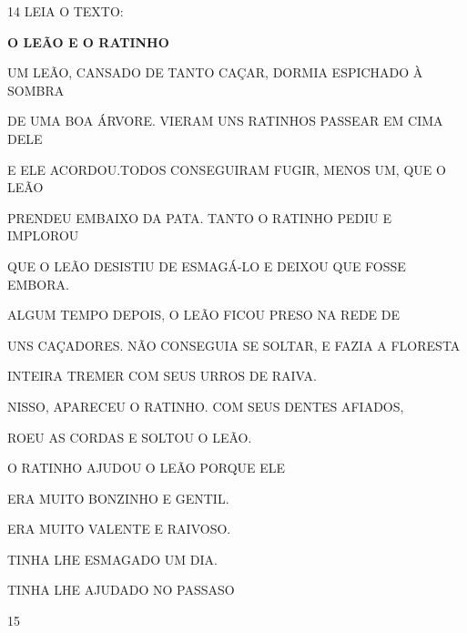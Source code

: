 \begin{escola}
{



\num{14} LEIA O TEXTO:

\textbf{O LEÃO E O RATINHO}

UM LEÃO, CANSADO DE TANTO CAÇAR, DORMIA ESPICHADO À SOMBRA

DE UMA BOA ÁRVORE. VIERAM UNS RATINHOS PASSEAR EM CIMA DELE

E ELE ACORDOU.TODOS CONSEGUIRAM FUGIR, MENOS UM, QUE O LEÃO

PRENDEU EMBAIXO DA PATA. TANTO O RATINHO PEDIU E IMPLOROU

QUE O LEÃO DESISTIU DE ESMAGÁ-LO E DEIXOU QUE FOSSE EMBORA.

ALGUM TEMPO DEPOIS, O LEÃO FICOU PRESO NA REDE DE

UNS CAÇADORES. NÃO CONSEGUIA SE SOLTAR, E FAZIA A FLORESTA

INTEIRA TREMER COM SEUS URROS DE RAIVA.

NISSO, APARECEU O RATINHO. COM SEUS DENTES AFIADOS,

ROEU AS CORDAS E SOLTOU O LEÃO.


O RATINHO AJUDOU O LEÃO PORQUE ELE

\begin{escolha}
\item ERA MUITO BONZINHO E GENTIL.

\item ERA MUITO VALENTE E RAIVOSO.

\item TINHA LHE ESMAGADO UM DIA.

\item TINHA LHE AJUDADO NO PASSASO
\end{escolha}


\num{15}


}
\end{escola}
